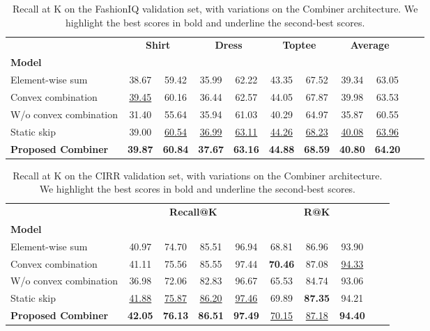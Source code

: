 \documentclass[acmlarge]{acmart}
\begin{document}
\begin{table}[tb]
\centering
\begin{tabular}{lcc  cc cc cc  cc}
\toprule

&\multicolumn{2}{c}{\textbf{Shirt}} & \multicolumn{2}{c}{\textbf{Dress}} & \multicolumn{2}{c}{\textbf{Toptee}} & \multicolumn{2}{c}{\textbf{Average}}\\
  \cmidrule(lr){2-3}
\cmidrule(lr){4-5}
  \cmidrule(lr){6-7}
  \cmidrule(lr){8-9}
\textbf{Model} &  &  &    &  &    &  &    &   \\
\midrule
Element-wise sum  & 38.67 & 59.42 & 35.99 & 62.22 & 43.35 & 67.52 & 39.34 & 63.05\\ 
Convex combination & \underline{39.45} & 60.16 & 36.44 & 62.57 & 44.05 & 67.87 & 39.98 & 63.53 \\  W/o convex combination & 31.40 & 55.64 & 35.94 & 61.03 & 40.29 & 64.97 & 35.87 & 60.55\\
Static skip & 39.00 & \underline{60.54} & \underline{36.99} & \underline{63.11} & \underline{44.26} & \underline{68.23} & \underline{40.08} & \underline{63.96} \\ \textbf{Proposed Combiner} & \textbf{39.87} & \textbf{60.84} & \textbf{37.67} & \textbf{63.16} & \textbf{44.88} & \textbf{68.59} & \textbf{40.80} & \textbf{64.20}\\\bottomrule
\end{tabular}
\caption{Recall at K on the FashionIQ validation set, with variations on the Combiner architecture. We highlight the best scores in bold and underline the second-best scores.}
\label{tab:ablation_fashion_combiner}
\vspace{-4ex}
\end{table} 

\begin{table}[tb]
\centering
\begin{tabular}{lcc  cccc ccc}
  \toprule
& \multicolumn{4}{c}{\textbf{Recall@K}} & \multicolumn{3}{c}{\textbf{R@K}} \\
\cmidrule(lr){2-5}
\cmidrule(lr){6-8}
\textbf{Model}  &  &  &   &  &   &  &   \\
\midrule
Element-wise sum  & 40.97 & 74.70 & 85.51 & 96.94 & 68.81 & 86.96 & 93.90 \\
Convex combination & 41.11 & 75.56 & 85.55 & 97.44 & \textbf{70.46} & 87.08 & \underline{94.33}  \\ W/o convex combination & 36.98 & 72.06 & 82.83 & 96.67 & 65.53 & 84.74 & 93.06 \\ Static skip & \underline{41.88} & \underline{75.87} & \underline{86.20} & \underline{97.46} & 69.89 & \textbf{87.35} & 94.21 \\ \textbf{Proposed Combiner} & \textbf{42.05} & \textbf{76.13} & \textbf{86.51} &\textbf{ 97.49} & \underline{70.15} & \underline{87.18} & \textbf{94.40}\\ \bottomrule \end{tabular}
\caption{Recall at K on the CIRR validation set, with variations on the Combiner architecture. We highlight the best scores in bold and underline the second-best scores.}
\label{tab:ablation_cirr_combiner}
\vspace{-4ex}
\end{table} 
\end{document}
